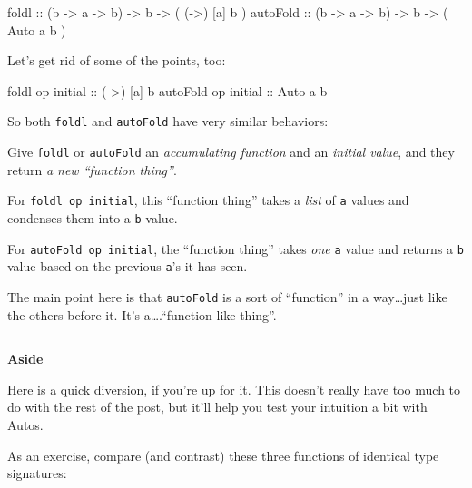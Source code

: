 \documentclass[]{article}
\newenvironment{Shaded}{}{}
\newcommand{\DataTypeTok}[1]{\textcolor[rgb]{0.56,0.13,0.00}{{#1}}}
\newcommand{\OtherTok}[1]{\textcolor[rgb]{0.00,0.44,0.13}{{#1}}}
\newcommand{\NormalTok}[1]{{#1}}
\begin{document}
\begin{Shaded}
\begin{Highlighting}[]
\NormalTok{foldl}\OtherTok{      ::} \NormalTok{(b }\OtherTok{->} \NormalTok{a }\OtherTok{->} \NormalTok{b) }\OtherTok{->} \NormalTok{b }\OtherTok{->} \NormalTok{( (}\OtherTok{->}\NormalTok{) [a] b )}
\OtherTok{autoFold   ::} \NormalTok{(b }\OtherTok{->} \NormalTok{a }\OtherTok{->} \NormalTok{b) }\OtherTok{->} \NormalTok{b }\OtherTok{->} \NormalTok{( }\DataTypeTok{Auto}  \NormalTok{a  b )}
\end{Highlighting}
\end{Shaded}

Let's get rid of some of the points, too:

\begin{Shaded}
\begin{Highlighting}[]
\NormalTok{foldl    op}\OtherTok{ initial  ::} \NormalTok{(}\OtherTok{->}\NormalTok{) [a] b}
\NormalTok{autoFold op}\OtherTok{ initial  ::} \DataTypeTok{Auto}  \NormalTok{a  b}
\end{Highlighting}
\end{Shaded}

So both \texttt{foldl} and \texttt{autoFold} have very similar
behaviors:

Give \texttt{foldl} or \texttt{autoFold} an \emph{accumulating function}
and an \emph{initial value}, and they return \emph{a new ``function
thing''}.

For \texttt{foldl\ op\ initial}, this ``function thing'' takes a
\emph{list} of \texttt{a} values and condenses them into a \texttt{b}
value.

For \texttt{autoFold\ op\ initial}, the ``function thing'' takes
\emph{one} \texttt{a} value and returns a \texttt{b} value based on the
previous \texttt{a}'s it has seen.

The main point here is that \texttt{autoFold} is a sort of ``function''
in a way\ldots{}just like the others before it. It's
a\ldots{}.``function-like thing''.

\begin{center}\rule{0.5\linewidth}{\linethickness}\end{center}

\textbf{Aside}

Here is a quick diversion, if you're up for it. This doesn't really have
too much to do with the rest of the post, but it'll help you test your
intuition a bit with Autos.

As an exercise, compare (and contrast) these three functions of
identical type signatures:
\end{document}
